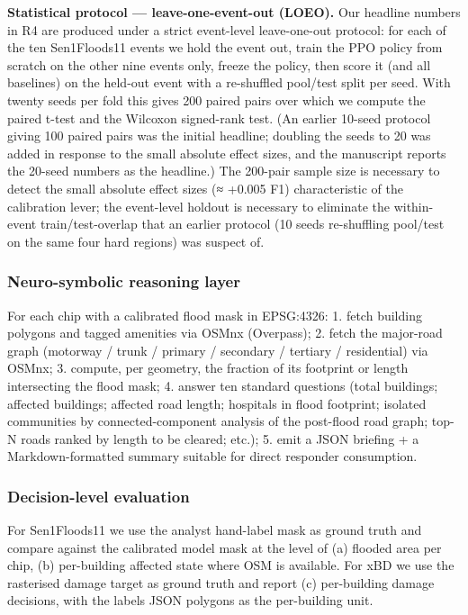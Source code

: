 \textbf{Statistical protocol --- leave-one-event-out (LOEO).} Our headline numbers
in R4 are produced under a strict event-level leave-one-out protocol: for
each of the ten Sen1Floods11 events we hold the event out, train the PPO
policy from scratch on the other nine events only, freeze the policy, then
score it (and all baselines) on the held-out event with a re-shuffled
pool/test split per seed. With twenty seeds per fold this gives 200
paired pairs over which we compute the paired t-test and the Wilcoxon
signed-rank test. (An earlier 10-seed protocol giving 100 paired pairs
was the initial headline; doubling the seeds to 20 was added in
response to the small absolute effect sizes, and the manuscript reports
the 20-seed numbers as the headline.) The 200-pair sample size is
necessary to detect the small absolute
effect sizes (≈ +0.005 F1) characteristic of the calibration lever; the
event-level holdout is necessary to eliminate the within-event
train/test-overlap that an earlier protocol (10 seeds re-shuffling
pool/test on the same four hard regions) was suspect of.

\subsubsection{Neuro-symbolic reasoning layer}\label{neuro-symbolic-reasoning-layer}

For each chip with a calibrated flood mask in EPSG:4326:
1. fetch building polygons and tagged amenities via OSMnx (Overpass);
2. fetch the major-road graph (motorway / trunk / primary / secondary /
tertiary / residential) via OSMnx;
3. compute, per geometry, the fraction of its footprint or length intersecting
the flood mask;
4. answer ten standard questions (total buildings; affected buildings; affected
road length; hospitals in flood footprint; isolated communities by
connected-component analysis of the post-flood road graph; top-N roads
ranked by length to be cleared; etc.);
5. emit a JSON briefing + a Markdown-formatted summary suitable for direct
responder consumption.

\subsubsection{Decision-level evaluation}\label{decision-level-evaluation}

For Sen1Floods11 we use the analyst hand-label mask as ground truth and
compare against the calibrated model mask at the level of (a) flooded area
per chip, (b) per-building affected state where OSM is available. For xBD
we use the rasterised damage target as ground truth and report (c)
per-building damage decisions, with the labels JSON polygons as the
per-building unit.

